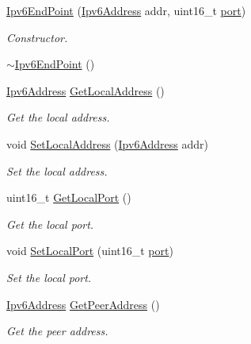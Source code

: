 \begin{DoxyCompactItemize}
\item 
\hyperlink{classns3_1_1Ipv6EndPoint_a90d79ec8311dec7db06e37a1e97dbf37}{Ipv6\+End\+Point} (\hyperlink{classns3_1_1Ipv6Address}{Ipv6\+Address} addr, uint16\+\_\+t \hyperlink{visualizer-ideas_8txt_a21ff1c530daf8435e00048b7fc2c58e3}{port})
\begin{DoxyCompactList}\small\item\em Constructor. \end{DoxyCompactList}\item 
\hyperlink{classns3_1_1Ipv6EndPoint_a8b38a96dc23b632b6f1d203f38d2dad8}{$\sim$\+Ipv6\+End\+Point} ()
\item 
\hyperlink{classns3_1_1Ipv6Address}{Ipv6\+Address} \hyperlink{classns3_1_1Ipv6EndPoint_a1972cd26240d42cd75f93e12d9182976}{Get\+Local\+Address} ()
\begin{DoxyCompactList}\small\item\em Get the local address. \end{DoxyCompactList}\item 
void \hyperlink{classns3_1_1Ipv6EndPoint_aa1dd94923ccc95928694197550d4561e}{Set\+Local\+Address} (\hyperlink{classns3_1_1Ipv6Address}{Ipv6\+Address} addr)
\begin{DoxyCompactList}\small\item\em Set the local address. \end{DoxyCompactList}\item 
uint16\+\_\+t \hyperlink{classns3_1_1Ipv6EndPoint_a39a9fd4aa85a8ecbbf2d6c84d589080b}{Get\+Local\+Port} ()
\begin{DoxyCompactList}\small\item\em Get the local port. \end{DoxyCompactList}\item 
void \hyperlink{classns3_1_1Ipv6EndPoint_a4d2c62c71afa9463fe245db9d58a4dfe}{Set\+Local\+Port} (uint16\+\_\+t \hyperlink{visualizer-ideas_8txt_a21ff1c530daf8435e00048b7fc2c58e3}{port})
\begin{DoxyCompactList}\small\item\em Set the local port. \end{DoxyCompactList}\item 
\hyperlink{classns3_1_1Ipv6Address}{Ipv6\+Address} \hyperlink{classns3_1_1Ipv6EndPoint_aa48c776ae54d85cf0f6a61a80d7b4cd8}{Get\+Peer\+Address} ()
\begin{DoxyCompactList}\small\item\em Get the peer address. \end{DoxyCompactList}\item 

\end{DoxyCompactItemize}
